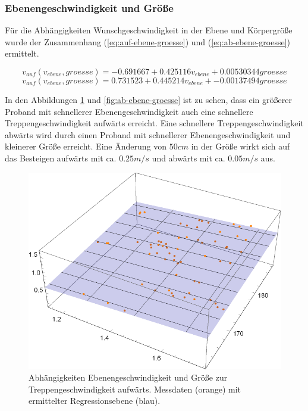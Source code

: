 \subsubsection{Ebenengeschwindigkeit und Größe}

Für die Abhängigkeiten Wunschgeschwindigkeit in der Ebene und Körpergröße wurde 
der Zusammenhang (\ref{eq:auf-ebene-groesse}) und (\ref{eq:ab-ebene-groesse}) ermittelt.

\begin{equation} \label{eq:auf-ebene-groesse}
	v_{auf}(v_{ebene}, groesse) = -0.691667 + 0.425116 v_{ebene} + 0.00530344 groesse
\end{equation}
\begin{equation} \label{eq:ab-ebene-groesse}
	v_{auf}(v_{ebene}, groesse) = 0.731523 + 0.445214 v_{ebene} + -0.00137494 groesse
\end{equation}

In den Abbildungen \ref{fig:auf-ebene-groesse} und \ref{fig:ab-ebene-groesse} ist 
zu sehen, dass ein größerer Proband mit schnellerer Ebenengeschwindigkeit auch eine schnellere Treppengeschwindigkeit aufwärts erreicht. Eine schnellere Treppengeschwindigkeit abwärts wird durch einen Proband mit schnellerer Ebenengeschwindigkeit und kleinerer Größe erreicht. Eine Änderung von $50 cm$ in der Größe wirkt sich auf das Besteigen aufwärts mit ca. $0.25 m/s$ und abwärts mit ca. $0.05 m/s$ aus.

\begin{figure} \centering 
	\includegraphics[]{abbildungen/regression/2017/auf-ebene-groesse.pdf}
	
	\caption{Abhängigkeiten Ebenengeschwindigkeit und Größe zur Treppengeschwindigkeit aufwärts. Messdaten (orange) mit ermittelter Regressionsebene (blau). \label{fig:auf-ebene-groesse}}
\end{figure}


